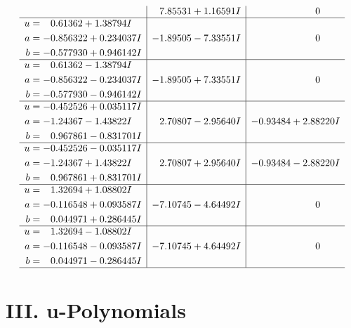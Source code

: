 \documentclass[1p]{elsarticle_modified}
\theoremstyle{definition}
\begin{document}
$$\begin{array}{c|c|c}
 & \phantom{-}7.85531 + 1.16591 I & \phantom{-0.000000 } 0 \\ \hline\begin{aligned}
u &= \phantom{-}0.61362 + 1.38794 I \\
a &= -0.856322 + 0.234037 I \\
b &= -0.577930 + 0.946142 I\end{aligned}
 & -1.89505 - 7.33551 I & \phantom{-0.000000 } 0 \\ \hline\begin{aligned}
u &= \phantom{-}0.61362 - 1.38794 I \\
a &= -0.856322 - 0.234037 I \\
b &= -0.577930 - 0.946142 I\end{aligned}
 & -1.89505 + 7.33551 I & \phantom{-0.000000 } 0 \\ \hline\begin{aligned}
u &= -0.452526 + 0.035117 I \\
a &= -1.24367 - 1.43822 I \\
b &= \phantom{-}0.967861 - 0.831701 I\end{aligned}
 & \phantom{-}2.70807 - 2.95640 I & -0.93484 + 2.88220 I \\ \hline\begin{aligned}
u &= -0.452526 - 0.035117 I \\
a &= -1.24367 + 1.43822 I \\
b &= \phantom{-}0.967861 + 0.831701 I\end{aligned}
 & \phantom{-}2.70807 + 2.95640 I & -0.93484 - 2.88220 I \\ \hline\begin{aligned}
u &= \phantom{-}1.32694 + 1.08802 I \\
a &= -0.116548 + 0.093587 I \\
b &= \phantom{-}0.044971 + 0.286445 I\end{aligned}
 & -7.10745 - 4.64492 I & \phantom{-0.000000 } 0 \\ \hline\begin{aligned}
u &= \phantom{-}1.32694 - 1.08802 I \\
a &= -0.116548 - 0.093587 I \\
b &= \phantom{-}0.044971 - 0.286445 I\end{aligned}
 & -7.10745 + 4.64492 I & \phantom{-0.000000 } 0\\
 \hline 
 \end{array}$$\newpage
\newpage\renewcommand{\arraystretch}{1}
\centering \section*{ III. u-Polynomials}
\end{document}
